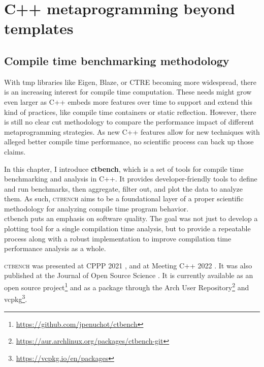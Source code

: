\documentclass[english,12pt,a4paper]{book}
\providecommand{\cpp}{\textsc{C++}\xspace}
\providecommand{\ctbench}{\textsc{ctbench}\xspace}
\begin{document}


\part{
  C++ metaprogramming beyond templates
}

\chapter{
  Compile time benchmarking methodology
}

With \gls{tmp} libraries like Eigen\cite{eigen}, Blaze\cite{blazelib},
or CTRE \cite{ctre} becoming more widespread,
there is an increasing interest for compile time computation.
These needs might grow
even larger as \cpp embeds more features over time to support and extend this
kind of practices, like compile time containers \cite{more-constexpr-containers}
or static reflection\cite{static-reflection}. However, there is still no clear
cut methodology to compare the performance impact of different metaprogramming
strategies.
As new \cpp features allow for new techniques with alleged
better compile time performance, no scientific process can back up those claims.

In this chapter, I introduce \textbf{ctbench}, which is a set of tools for
compile time benchmarking and analysis in \cpp. It provides developer-friendly
tools
to define and run benchmarks, then aggregate, filter out, and plot the data to
analyze them. As such, \ctbench aims to be a foundational layer of a proper
scientific methodology for analyzing compile time program behavior.
\\

ctbench puts an emphasis on software quality.
The goal was not just to develop a plotting tool for a single
compilation time analysis, but to provide a repeatable process
along with a robust implementation to improve compilation time
performance analysis as a whole.


\ctbench was presented at CPPP 2021 \cite{ctbench-cppp21},
and at Meeting \cpp 2022 \cite{meetingcpp22}. It was also published
at the Journal of Open Source Science \cite{Penuchot2023}. It is currently
available as an open source
project\footnote{\url{https://github.com/jpenuchot/ctbench}} and as a package
through the Arch User
Repository\footnote{\url{https://aur.archlinux.org/packages/ctbench-git}}
and vcpkg\footnote{\url{https://vcpkg.io/en/packages}}.
\end{document}
